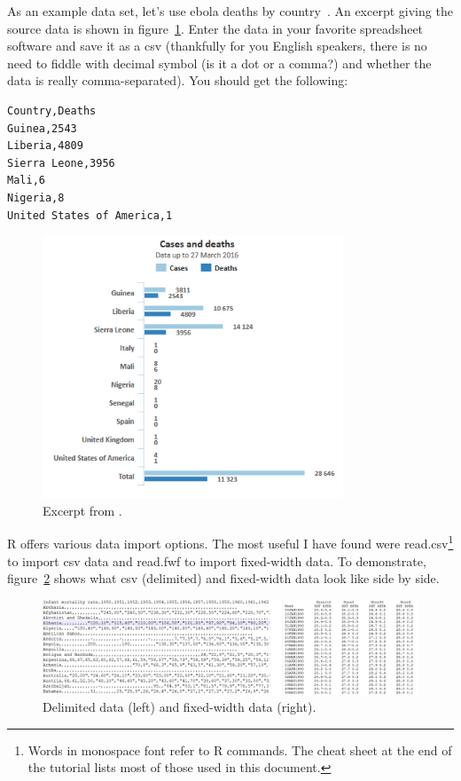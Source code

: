 \documentclass{report}
\newcommand{\code}[1]{\textsf{\ttfamily #1}}
\begin{document}
As an example data set, let's use ebola deaths by country~\cite{who}. An excerpt giving the source data is shown in figure~\ref{fig:ebola}. Enter the data in your favorite spreadsheet software and save it as a csv (thankfully for you English speakers, there is no need to fiddle with decimal symbol (is it a dot or a comma?) and whether the data is really comma-separated). You should get the following:
\begin{verbatim}
Country,Deaths
Guinea,2543
Liberia,4809
Sierra Leone,3956
Mali,6
Nigeria,8
United States of America,1
\end{verbatim}
\begin{figure}[h]
	\centering
	\includegraphics[width=0.8\textwidth]{ebola.png}
	\caption{Excerpt from \cite{who}.}
	\label{fig:ebola}
\end{figure}

R offers various data import options. The most useful I have found were \code{read.csv}\footnote{Words in monospace font refer to R commands. The cheat sheet at the end of the tutorial lists most of those used in this document.} to import csv data and \code{read.fwf} to import fixed-width data. To demonstrate, figure~\ref{fig:data} shows what csv (delimited) and fixed-width data look like side by side.
\begin{figure}[h]
	\centering
	\includegraphics[width=1.0\textwidth]{data.png}
	\caption{Delimited data (left) and fixed-width data (right).}
	\label{fig:data}
\end{figure}
\end{document}
